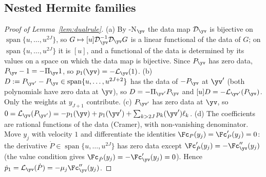 \subsection{Nested Hermite families}\label{app:proofs-hermite}
\begin{proof}[Proof of Lemma~\textup{\ref{lem:dualrule}}]
(a) By \hyp{N}$_{\yv}$ the data map $\mathcal D_{\yv}$ is bijective on $\operatorname{span}\{u,\dots,u^{2J}\}$, so
$G\mapsto[u]\mathcal D_{\yv}^{-1}\mathcal D_{\yv}G$ is a linear functional of the data of $G$; on
$\operatorname{span}\{u,\dots,u^{2J}\}$ it is $[u]$, and a functional of the data is determined by its values on a
space on which the data map is bijective. Since $P_{\yv}$ has zero data,
$P_{\yv}-1=-\Pi_{\yv}1$, so $p_1(\yv)=-\mathcal L_{\yv}(1)$.
(b) $D:=P_{\yv'}-P_{\yv}\in\operatorname{span}\{u,\dots,u^{2J+2}\}$ has the data of $-P_{\yv}$ at $\yv'$ (both
polynomials have zero data at $\yv$), so $D=-\Pi_{\yv'}P_{\yv}$ and $[u]D=-\mathcal L_{\yv'}(P_{\yv})$. Only the
weights at $y_{J+1}$ contribute.
(c) $P_{\yv'}$ has zero data at $\yv$, so
$0=\mathcal L_{\yv}(P_{\yv'})=-p_1(\yv)+p_1(\yv')+\sum_{k>2J}p_k(\yv')\ell_k$.
(d) The coefficients are rational functions of the data (Cramer), with non-vanishing denominator. Move
$y_j$ with velocity $1$ and differentiate the identities $\Fc_P(y_j)=\Fc_P'(y_j)=0$: the derivative
$\dot P\in\operatorname{span}\{u,\dots,u^{2J}\}$ has zero data except $\Fc_{\dot P}'(y_j)=-\Fc_{\yv}''(y_j)$ (the value
condition gives $\Fc_{\dot P}(y_j)=-\Fc'_{\yv}(y_j)=0$). Hence $\dot p_1=\mathcal L_{\yv}(\dot P)=-\mu_j\Fc_{\yv}''(y_j)$.
\end{proof}

